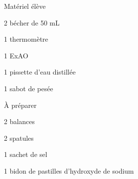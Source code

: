 
\begin{boiteMateriel}{Matériel élève}
  \effectifSeconde
  
  \begin{protocole}[2]
    \item 2 bécher de 50 mL
    \item 1 thermomètre
    \item 1 ExAO
    \item 1 pissette d'eau distillée
    \item 1 sabot de pesée
  \end{protocole}
\end{boiteMateriel}


\begin{boiteMateriel}{À préparer}
  \begin{protocole}
    \item 2 balances
    \item 2 spatules
    \item 1 sachet de sel
    \item 1 bidon de pastilles d'hydroxyde de sodium
  \end{protocole}
\end{boiteMateriel}
